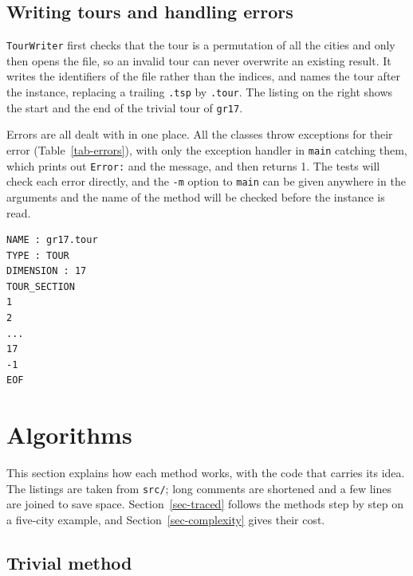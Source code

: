\documentclass[10pt,a4paper]{article}
\makeatletter
\let\tsp@section\section
\renewcommand{\section}{\FloatBarrier\tsp@section}
\makeatother
\begin{document}
\subsection{Writing tours and handling errors}\label{sec-writing}

\noindent
\begin{minipage}[t]{0.70\linewidth}
\vspace{0pt}
\setlength{\parindent}{1.2em}\noindent
\texttt{TourWriter} first checks that the tour is a permutation of all the cities and only then opens the file, so an invalid tour can never overwrite an existing result. It writes the identifiers of the file rather than the indices, and names the tour after the instance, replacing a trailing \texttt{.tsp} by \texttt{.tour}. The listing on the right shows the start and the end of the trivial tour of \texttt{gr17}.

Errors are all dealt with in one place. All the classes throw exceptions for their error (Table~\ref{tab-errors}), with only the exception handler in \texttt{main} catching them, which prints out \texttt{Error:} and the message, and then returns 1. The tests will check each error directly, and the \texttt{-m} option to \texttt{main} can be given anywhere in the arguments and the name of the method will be checked before the instance is read.
\end{minipage}\hfill
\begin{minipage}[t]{0.26\linewidth}
\vspace{0pt}
\begin{lstlisting}[language={}, style=side]
NAME : gr17.tour
TYPE : TOUR
DIMENSION : 17
TOUR_SECTION
1
2
...
17
-1
EOF
\end{lstlisting}
\end{minipage}\hspace*{3pt}

\section{Algorithms}\label{sec-algorithms}

This section explains how each method works, with the code that carries its idea. The listings are taken from \texttt{src/}; long comments are shortened and a few lines are joined to save space. Section~\ref{sec-traced} follows the methods step by step on a five-city example, and Section~\ref{sec-complexity} gives their cost.

\subsection{Trivial method}\label{sec-trivial}
\end{document}
